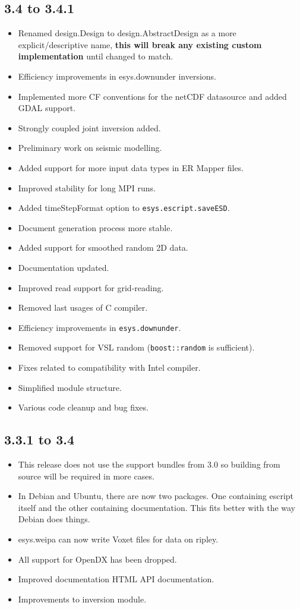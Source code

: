 \subsection*{3.4 to 3.4.1}
\begin{itemize}
 \item Renamed design.Design to design.AbstractDesign as a more explicit/descriptive name, {\bf this will break any existing custom implementation} until changed to match.

 \item Efficiency improvements in esys.downunder inversions.
 \item Implemented more CF conventions for the netCDF datasource and added GDAL support.
 \item Strongly coupled joint inversion added.
 \item Preliminary work on seismic modelling.
 \item Added support for more input data types in ER Mapper files.
 \item Improved stability for long MPI runs.
 \item Added timeStepFormat option to \texttt{esys.escript.saveESD}.
 \item Document generation process more stable.
 \item Added support for smoothed random 2D data.
 \item Documentation updated.
 \item Improved read support for grid-reading.
 \item Removed last usages of C compiler.
 \item Efficiency improvements in \texttt{esys.downunder}.
 \item Removed support for VSL random (\texttt{boost::random} is sufficient).
 \item Fixes related to compatibility with Intel compiler.
 \item Simplified module structure.
 \item Various code cleanup and bug fixes.
\end{itemize}

\subsection*{3.3.1 to 3.4}
\begin{itemize}
 \item This release does not use the support bundles from $3.0$ so building from source will be required in more cases.
 \item In Debian and Ubuntu, there are now two packages. One containing escript itself and the other containing documentation.
This fits better with the way Debian does things.
 \item esys.weipa can now write Voxet files for data on ripley.
 \item All support for OpenDX has been dropped.
 \item Improved documentation HTML API documentation.
 \item Improvements to inversion module. 
\end{itemize}


